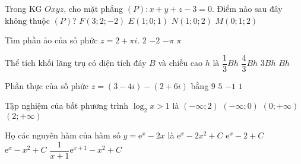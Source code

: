 \begin{ex}%
	Trong KG $Oxyz$, cho mặt phẳng $(P) \colon x+y+z-3=0$. Điểm nào sau đây không thuộc $(P)$?
	\choice
	{$F(3;2;-2)$}
	{\True $E(1;0;1)$}
	{$N(1;0;2)$}
	{$M(0;1;2)$}
\end{ex}


\begin{ex}%
	Tìm phần ảo của số phức $z=2+\pi i$.
	\choice
	{$2$}
	{$-2$}
	{$-\pi$}
	{\True $\pi$}
\end{ex}


\begin{ex}%
	Thể tích khối lăng trụ có diện tích đáy $B$ và chiều cao $h$ là
	\choice
	{$\dfrac{1}{3}Bh$}
	{$\dfrac{4}{3}Bh$}
	{$3Bh$}
	{\True $Bh$}
\end{ex}


\begin{ex}%
	Phần thực của số phức $z=(3-4i)-(2+6i)$ bằng
	\choice
	{$9$}
	{$5$}
	{$-1$}
	{\True $1$}
\end{ex}


\begin{ex}%
	Tập nghiệm của bất phương trình $\log _2x>1$ là
	\choice
	{$(-\infty;2)$}
	{$(-\infty;0)$}
	{$(0;+\infty)$}
	{\True $(2;+\infty)$}
\end{ex}


\begin{ex}%
	Họ các nguyên hàm của hàm số $y=\mathrm{e}^x-2x$ là
	\choice
	{$\mathrm{e}^x-2x^2+C$}
	{$\mathrm{e}^x-2+C$}
	{\True $\mathrm{e}^x-x^2+C$}
	{$\dfrac{1}{x+1}\mathrm{e}^{x+1}-x^2+C$}
\end{ex}


